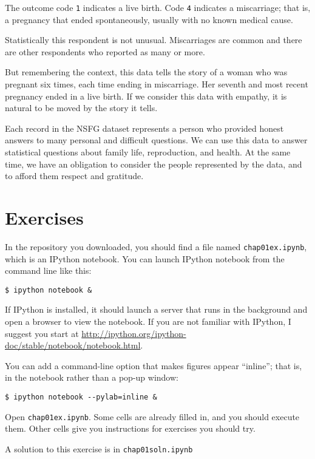 The outcome code {\tt 1} indicates a live birth. Code {\tt 4} indicates
a miscarriage; that is, a pregnancy that ended spontaneously, usually
with no known medical cause.

Statistically this respondent is not unusual.  Miscarriages are common
and there are other respondents who reported as many or more.

But remembering the context, this data tells the story of a woman who
was pregnant six times, each time ending in miscarriage.  Her seventh
and most recent pregnancy ended in a live birth.  If we consider this
data with empathy, it is natural to be moved by the story it tells.

Each record in the NSFG dataset represents a person who provided
honest answers to many personal and difficult questions.  We can use
this data to answer statistical questions about family life,
reproduction, and health.  At the same time, we have an obligation
to consider the people represented by the data, and to afford them
respect and gratitude.


\section{Exercises}

\begin{exercise}
In the repository you downloaded, you should find a file named
\verb"chap01ex.ipynb", which is an IPython notebook.  You can
launch IPython notebook from the command line like this:

\begin{verbatim}
$ ipython notebook &
\end{verbatim}

If IPython is installed, it should launch a server that runs in the
background and open a browser to view the notebook.  If you are not
familiar with IPython, I suggest you start at
\url{http://ipython.org/ipython-doc/stable/notebook/notebook.html}.

You can add a command-line option that makes figures appear ``inline'';
that is, in the notebook rather than a pop-up window:

\begin{verbatim}
$ ipython notebook --pylab=inline &
\end{verbatim}

Open \verb"chap01ex.ipynb".  Some cells are already filled in, and
you should execute them.  Other cells give you instructions for
exercises you should try.

A solution to this exercise is in \verb"chap01soln.ipynb"
\end{exercise}


